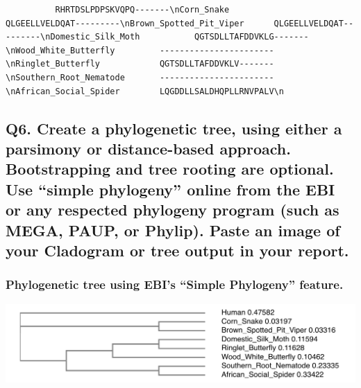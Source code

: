 \documentclass[
  letterpaper,
  DIV=11,
  numbers=noendperiod]{scrartcl}
\begin{document}
\begin{verbatim}
          RHRTDSLPDPSKVQPQ-------\nCorn_Snake                   QLGEELLVELDQAT---------\nBrown_Spotted_Pit_Viper      QLGEELLVELDQAT---------\nDomestic_Silk_Moth           QGTSDLLTAFDDVKLG-------\nWood_White_Butterfly         -----------------------\nRinglet_Butterfly            QGTSDLLTAFDDVKLV-------\nSouthern_Root_Nematode       -----------------------\nAfrican_Social_Spider        LQGDDLLSALDHQPLLRNVPALV\n                                                    
\end{verbatim}

\hypertarget{q6.-create-a-phylogenetic-tree-using-either-a-parsimony-or-distance-based-approach.-bootstrapping-and-tree-rooting-are-optional.-use-simple-phylogeny-online-from-the-ebi-or-any-respected-phylogeny-program-such-as-mega-paup-or-phylip.-paste-an-image-of-your-cladogram-or-tree-output-in-your-report.}{%
\subsection{\texorpdfstring{Q6. \textbf{Create a phylogenetic tree,
using either a parsimony or distance-based approach. Bootstrapping and
tree rooting are optional. Use ``simple phylogeny'' online from the EBI
or any respected phylogeny program (such as MEGA, PAUP, or Phylip).
Paste an image of your Cladogram or tree output in your
report.}}{Q6. Create a phylogenetic tree, using either a parsimony or distance-based approach. Bootstrapping and tree rooting are optional. Use ``simple phylogeny'' online from the EBI or any respected phylogeny program (such as MEGA, PAUP, or Phylip). Paste an image of your Cladogram or tree output in your report.}}\label{q6.-create-a-phylogenetic-tree-using-either-a-parsimony-or-distance-based-approach.-bootstrapping-and-tree-rooting-are-optional.-use-simple-phylogeny-online-from-the-ebi-or-any-respected-phylogeny-program-such-as-mega-paup-or-phylip.-paste-an-image-of-your-cladogram-or-tree-output-in-your-report.}}

\hypertarget{phylogenetic-tree-using-ebis-simple-phylogeny-feature.}{%
\subsubsection{Phylogenetic tree using EBI's ``Simple Phylogeny''
feature.}\label{phylogenetic-tree-using-ebis-simple-phylogeny-feature.}}

\includegraphics{images/Screen Shot 2023-06-18 at 6.03.37 AM.png}
\end{document}
